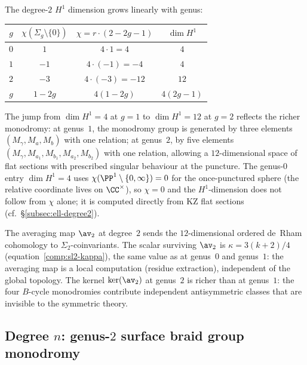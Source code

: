 \begin{remark}
\label{rem:h1-comparison}
The degree-$2$ $H^1$ dimension grows linearly with genus:
\begin{center}
\renewcommand{\arraystretch}{1.2}
\begin{tabular}{@{} c c c c @{}}
  \toprule
  $g$ & $\chi({\Sigma_g \setminus \{0\}})$ &
  $\chi = r \cdot (2 - 2g - 1)$ & $\dim H^1$ \\
  \midrule
  $0$ & $1$ & $4 \cdot 1 = 4$ & $4$ \\
  $1$ & $-1$ & $4 \cdot (-1) = -4$ & $4$ \\
  $2$ & $-3$ & $4 \cdot (-3) = -12$ & $12$ \\
  $g$ & $1 - 2g$ & $4(1 - 2g)$ & $4(2g - 1)$ \\
  \bottomrule
\end{tabular}
\end{center}
The jump from $\dim H^1 = 4$ at $g = 1$ to $\dim H^1 = 12$
at $g = 2$ reflects the richer monodromy: at genus~$1$, the
monodromy group is generated by three elements
$(M_\gamma, M_a, M_b)$ with one relation; at genus~$2$,
by five elements $(M_\gamma, M_{a_1}, M_{b_1}, M_{a_2},
M_{b_2})$ with one relation, allowing a $12$-dimensional
space of flat sections with prescribed singular behaviour at
the puncture. The genus-$0$ entry $\dim H^1 = 4$ uses
$\chi(\PP^1 \setminus \{0, \infty\}) = 0$ for the
once-punctured sphere (the relative coordinate lives on
$\CC^\times$), so
$\chi = 0$ and the $H^1$-dimension does not follow from
$\chi$ alone; it is computed directly from KZ flat sections
\textup{(}cf.\ \S\ref{subsec:ell-degree2}\textup{)}.
\end{remark}

\begin{remark}
\label{rem:g2-shadow}
The averaging map $\av_2$ at degree~$2$ sends the
$12$-dimensional ordered de~Rham cohomology to
$\Sigma_2$-coinvariants. The scalar surviving $\av_2$ is
$\kappa = 3(k+2)/4$
(equation~\eqref{comp:sl2-kappa}), the same value as at
genus~$0$ and genus~$1$: the averaging map is a local
computation (residue extraction), independent of the global
topology.
The kernel $\ker(\av_2)$ at genus~$2$ is richer than at
genus~$1$: the four $B$-cycle monodromies contribute
independent antisymmetric classes that are invisible to the
symmetric theory.
\end{remark}

\subsection{Degree $n$: genus-$2$ surface braid group
monodromy}
\label{subsec:g2-degree-n}

